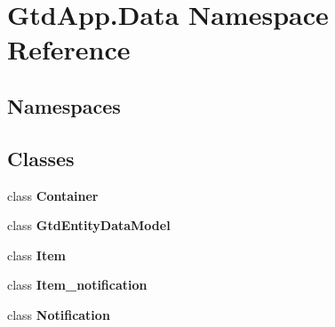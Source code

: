 \section{Gtd\+App.\+Data Namespace Reference}
\label{namespace_gtd_app_1_1_data}
\subsection*{Namespaces}
\begin{DoxyCompactItemize}
\end{DoxyCompactItemize}
\subsection*{Classes}
\begin{DoxyCompactItemize}
\item 
class \textbf{ Container}
\item 
class \textbf{ Gtd\+Entity\+Data\+Model}
\item 
class \textbf{ Item}
\item 
class \textbf{ Item\+\_\+notification}
\item 
class \textbf{ Notification}
\end{DoxyCompactItemize}
